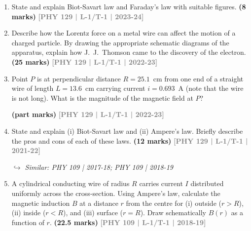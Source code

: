 \documentclass[12pt,a3paper]{article}
\newcommand{\yr}[1]{\hfill\textcolor{gray}{\small\textbf{[#1]}}}
\newcommand{\mk}[1]{\textcolor{orange!70!black}{\small\textbf{(#1 marks)}}}
\newcommand{\variant}[1]{\par\vspace{1pt}\textcolor{blue!50!black}%
  {\footnotesize\textit{$\hookrightarrow$ Similar: #1}}}
\begin{document}
\begin{enumerate}
\begin{center}
\begin{tikzpicture}[scale=1.5, >=stealth]
    
\end{tikzpicture}
\end{center}
 \mk{12} \yr{PHY 129 | L-1/T-1 | 2024-25}


\item State and explain Biot-Savart law and Faraday's law with suitable figures.
\mk{8} \yr{PHY 129 | L-1/T-1 | 2023-24}

\item Describe how the Lorentz force on a metal wire can affect the motion of a charged particle. By drawing the appropriate schematic diagrams of the apparatus, explain how J.~J.~Thomson came to the discovery of the electron.
\mk{25} \yr{PHY 129 | L-1/T-1 | 2022-23}

\item Point $P$ is at perpendicular distance $R = 25.1$~cm from one end of a straight wire of length $L = 13.6$~cm carrying current $i = 0.693$~A (note that the wire is not long). What is the magnitude of the magnetic field at $P$?
\begin{center}
\end{center}

\mk{part} \yr{PHY 129 | L-1/T-1 | 2022-23}

\item State and explain (i) Biot-Savart law and (ii) Ampere's law. Briefly describe the pros and cons of each of these laws.
\mk{12} \yr{PHY 129 | L-1/T-1 | 2021-22}
\variant{PHY 109 | 2017-18; PHY 109 | 2018-19}

\item A cylindrical conducting wire of radius $R$ carries current $I$ distributed uniformly across the cross-section. Using Ampere's law, calculate the magnetic induction $B$ at a distance $r$ from the centre for (i) outside ($r>R$), (ii) inside ($r<R$), and (iii) surface ($r=R$). Draw schematically $B(r)$ as a function of $r$.
\mk{22.5} \yr{PHY 109 | L-1/T-1 | 2018-19}


\end{enumerate}
\end{document}
